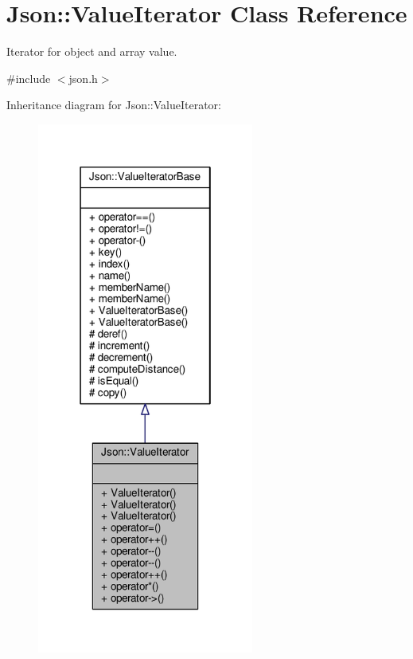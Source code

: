 \hypertarget{classJson_1_1ValueIterator}{}\section{Json\+:\+:Value\+Iterator Class Reference}
\label{classJson_1_1ValueIterator}


Iterator for object and array value.  




{\ttfamily \#include $<$json.\+h$>$}



Inheritance diagram for Json\+:\+:Value\+Iterator\+:
\nopagebreak
\begin{figure}[H]
\begin{center}
\leavevmode
\includegraphics[width=202pt]{d3/d75/classJson_1_1ValueIterator__inherit__graph}
\end{center}
\end{figure}


